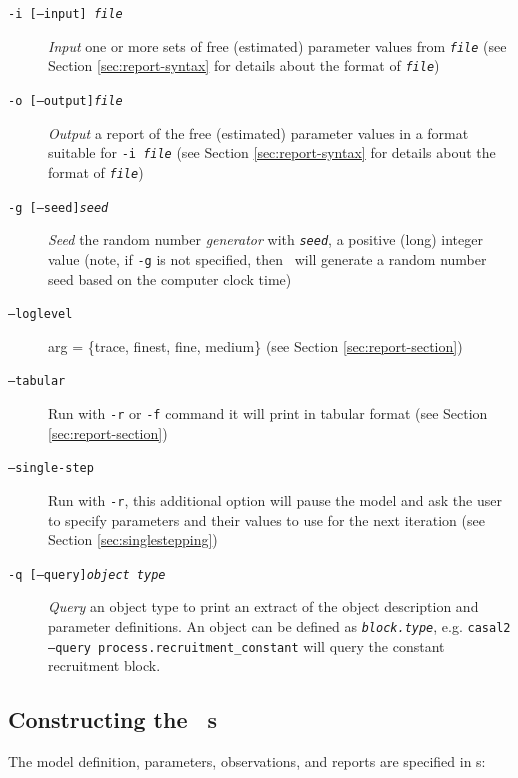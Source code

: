 \begin{description}
\item [\texttt{-i [--input] \emph{file}}] \emph{Input} one or more sets of free (estimated) parameter values from \texttt{\emph{file}} (see Section \ref{sec:report-syntax} for details about the format of \texttt{\emph{file}})

\item [\texttt{-o [--output]\emph{file}}] \emph{Output} a report of the free (estimated) parameter values in a format suitable for \texttt{-i \emph{file}} (see Section \ref{sec:report-syntax} for details about the format of \texttt{\emph{file}})

\item [\texttt{-g [--seed]\emph{seed}}]  \emph{Seed} the random number \emph{generator} with \texttt{\emph{seed}}, a positive (long) integer value (note, if \texttt{-g} is not specified, then \CNAME\ will  generate a random number seed based on the computer clock time)

\item [\texttt{--loglevel}] arg = \{trace, finest, fine, medium\} (see Section \ref{sec:report-section})

\item [\texttt{--tabular}] Run with \texttt{-r} or \texttt{-f}  command it will print  in tabular format (see Section \ref{sec:report-section})

\item [\texttt{--single-step}] Run with \texttt{-r}, this additional option will pause the model and ask the user to specify parameters and their values to use for the next iteration (see Section \ref{sec:singlestepping})

\item [\texttt{-q [--query]\emph{object type}}] \emph{Query} an object type to print an extract of the object description and parameter definitions.  An object can be defined as \texttt{\emph{block.type}}, e.g. \texttt{casal2 --query process.recruitment\_constant} will query the constant recruitment block.

\end{description}

\subsection{Constructing the \CNAME\ \config s \label{constructing-config}}

The model definition, parameters, observations, and reports are specified in \config s:
 
